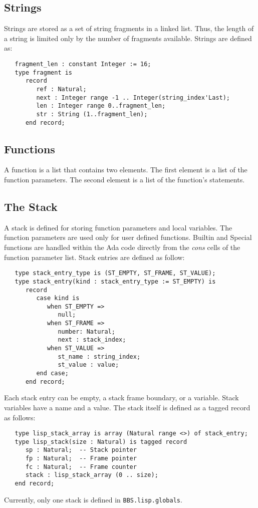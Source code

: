 \documentclass[10pt, openany]{book}
\newcommand{\package}[1]{\texttt{#1}}
\begin{document}
\subsection{Strings}
\label{sec:strings}
Strings are stored as a set of string fragments in a linked list.  Thus, the length of a string is limited only by the number of fragments available.  Strings are defined as:
\begin{lstlisting}
   fragment_len : constant Integer := 16;
   type fragment is
      record
         ref : Natural;
         next : Integer range -1 .. Integer(string_index'Last);
         len : Integer range 0..fragment_len;
         str : String (1..fragment_len);
      end record;
\end{lstlisting}

\subsection{Functions}
\label{sec:Functions}
A function is a list that contains two elements.  The first element is a list of the function parameters.  The second element is a list of the function's statements.

\subsection{The Stack}
\label{sec:Stack}
A stack is defined for storing function parameters and local variables.  The function parameters are used only for user defined functions.  Builtin and Special functions are handled within the Ada code directly from the \emph{cons} cells of the function parameter list.  Stack entries are defined as follow:
\begin{lstlisting}
   type stack_entry_type is (ST_EMPTY, ST_FRAME, ST_VALUE);
   type stack_entry(kind : stack_entry_type := ST_EMPTY) is
      record
         case kind is
            when ST_EMPTY =>
               null;
            when ST_FRAME =>
               number: Natural;
               next : stack_index;
            when ST_VALUE =>
               st_name : string_index;
               st_value : value;
         end case;
      end record;
\end{lstlisting}
Each stack entry can be empty, a stack frame boundary, or a variable.  Stack variables have a name and a value.  The stack itself is defined as a tagged record as follows:
\begin{lstlisting}
   type lisp_stack_array is array (Natural range <>) of stack_entry;
   type lisp_stack(size : Natural) is tagged record
      sp : Natural;  -- Stack pointer
      fp : Natural;  -- Frame pointer
      fc : Natural;  -- Frame counter
      stack : lisp_stack_array (0 .. size);
   end record;
\end{lstlisting}
Currently, only one stack is defined in \package{BBS.lisp.globals}.
\end{document}
